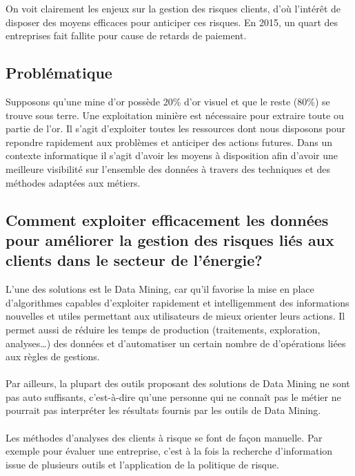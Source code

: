 \documentclass[11pt,a4paper]{report}
\begin{document}
On voit clairement les enjeux sur la gestion des risques clients, d'où l'intérêt de disposer des moyens efficaces pour anticiper ces risques. En 2015, un quart des entreprises fait fallite pour cause de retards de paiement.

\newpage
\subsection{Problématique}
Supposons qu’une mine d’or possède 20\% d’or visuel et que le reste (80\%) se trouve sous terre. Une exploitation minière est nécessaire pour extraire toute ou partie de l’or. Il s'agit d'exploiter toutes les ressources dont nous disposons pour repondre rapidement aux problèmes et anticiper des actions futures. 
Dans un contexte informatique il s’agit d’avoir les moyens à disposition afin d’avoir une meilleure visibilité sur l’ensemble des données à travers des techniques et des méthodes adaptées aux métiers. 
\subsection*{Comment exploiter efficacement les données pour améliorer la gestion des risques liés aux clients dans le secteur de l’énergie?}

L’une des solutions est le Data Mining, car qu’il favorise la mise en place d'algorithmes capables d'exploiter rapidement et intelligemment des informations nouvelles et utiles permettant aux utilisateurs de mieux orienter leurs actions. Il permet aussi de réduire les temps de production (traitements, exploration, analyses…) des données et d’automatiser un certain nombre de d'opérations liées aux règles de gestions.\\\\
Par ailleurs, la plupart des outils proposant des solutions de Data Mining ne sont pas auto suffisants, c’est-à-dire qu'une personne qui ne connaît pas le métier ne pourrait pas interpréter les résultats fournis par les outils de Data Mining.\\\\
 Les méthodes d'analyses des clients à risque se font de façon manuelle. Par exemple pour évaluer une entreprise, c'est à la fois la recherche d'information issue de plusieurs outils et l'application de la politique de risque. \\\\
\end{document}
